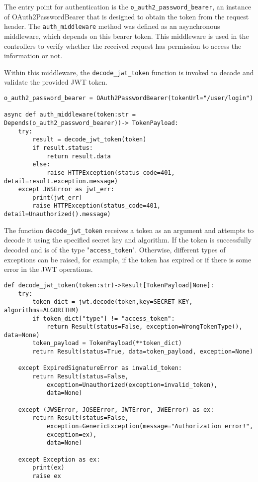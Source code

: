 The entry point for authentication is the \texttt{o\_auth2\_password\_bearer}, an instance of OAuth2PasswordBearer that is designed to obtain the token from the request header. The \texttt{auth\_middleware} method was defined as an asynchronous middleware, which depends on this bearer token. This middleware is used in the controllers to verify whether the received request has permission to access the information or not.

Within this middleware, the \texttt{decode\_jwt\_token} function is invoked to decode and validate the provided \gls{JWT} token.

\begin{Verbatim}[fontsize=\small, baselinestretch=0.6]
o_auth2_password_bearer = OAuth2PasswordBearer(tokenUrl="/user/login")

async def auth_middleware(token:str = Depends(o_auth2_password_bearer))-> TokenPayload:
    try:
        result = decode_jwt_token(token)
        if result.status:
            return result.data
        else:
            raise HTTPException(status_code=401, detail=result.exception.message)
    except JWSError as jwt_err:
        print(jwt_err)
        raise HTTPException(status_code=401, detail=Unauthorized().message)
\end{Verbatim}

The function \texttt{decode\_jwt\_token} receives a token as an argument and attempts to decode it using the specified secret key and algorithm. If the token is successfully decoded and is of the type "\texttt{access\_token}". Otherwise, different types of exceptions can be raised, for example, if the token has expired or if there is some error in the \gls{JWT} operations.

\begin{Verbatim}[fontsize=\small, baselinestretch=0.6]
def decode_jwt_token(token:str)->Result[TokenPayload|None]:
    try:
        token_dict = jwt.decode(token,key=SECRET_KEY, algorithms=ALGORITHM)
        if token_dict["type"] != "access_token":
            return Result(status=False, exception=WrongTokenType(), data=None)
        token_payload = TokenPayload(**token_dict)
        return Result(status=True, data=token_payload, exception=None)
    
    except ExpiredSignatureError as invalid_token:
        return Result(status=False,
            exception=Unauthorized(exception=invalid_token),
            data=None)

    except (JWSError, JOSEError, JWTError, JWEError) as ex:
        return Result(status=False,
            exception=GenericException(message="Authorization error!",
            exception=ex),
            data=None)

    except Exception as ex:
        print(ex)
        raise ex
\end{Verbatim}

